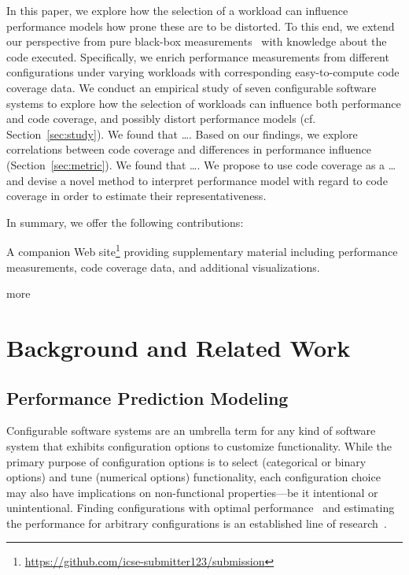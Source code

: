 In this paper, we explore how the selection of a workload can influence performance models how prone these are to be distorted. To this end, we extend our perspective from pure black-box measurements~\cite{dorn2020,siegmundPerformanceinfluenceModelsHighly2015,haDeepPerf2019,perfAL,guoVariabilityawarePerformancePrediction2013,sarkarCostEfficientSamplingPerformance,guo_2018_data,fourier_learning_2015,perLasso} with knowledge about the code executed. Specifically, we enrich performance measurements from different configurations under varying workloads with corresponding easy-to-compute code coverage data. 
We conduct an empirical study of seven configurable software systems to explore how the selection of workloads can influence both performance and code coverage, and possibly distort performance models (cf. Section~\ref{sec:study}). {\color{teal}We found that \ldots.} 
Based on our findings, we explore correlations between code coverage and differences in performance influence (Section~\ref{sec:metric}). {\color{teal}	We found that \ldots. We propose to use code coverage as a \ldots and devise a novel method to interpret performance model with regard to code coverage in order to estimate their representativeness.}

In summary, we offer the following contributions:
\begin{compactitem}
	\item A companion Web site\footnote{\url{https://github.com/icse-submitter123/submission}} providing supplementary material including performance measurements, code coverage data, and additional visualizations.
	\item more 
\end{compactitem}

\section{Background and Related Work}
\subsection{Performance Prediction Modeling}
Configurable software systems are an umbrella term for any kind of software system that exhibits configuration options to customize functionality. 
While the primary purpose of configuration options is to select (categorical or binary options) and tune (numerical options) functionality, each configuration choice may also have implications on non-functional properties---be it intentional or unintentional. Finding configurations with optimal performance~\cite{nairUsingBadLearners2017,nairFlash18,ohFindingNearoptimalConfigurations2017} and estimating the performance for arbitrary configurations is an established line of research~\cite{siegmundPerformanceinfluenceModelsHighly2015,haDeepPerf2019,perfAL,guoVariabilityawarePerformancePrediction2013,sarkarCostEfficientSamplingPerformance,guo_2018_data,fourier_learning_2015,perLasso}. 

